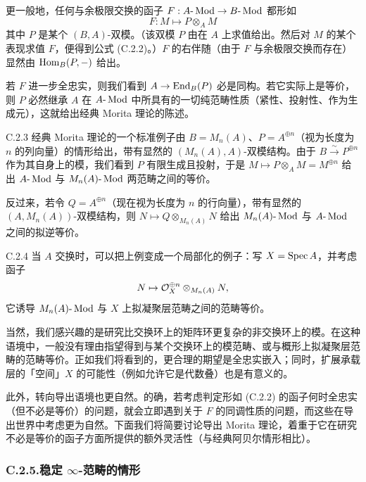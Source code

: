 
更一般地，任何与余极限交换的函子 $F:A\text{-}\operatorname{Mod}\to B\text{-}\operatorname{Mod}$ 都形如
\begin{equation}\tag{C.2.2}\label{eq:a4-19-1}
F:M\mapsto P\otimes_A M
\end{equation}
其中 $P$ 是某个 $(B,A)$-双模。（该双模 $P$ 由在 $A$ 上求值给出。然后对 $M$ 的某个表现求值 $F$，便得到公式 (C.2.2)。）$F$ 的右伴随（由于 $F$ 与余极限交换而存在）显然由 $\operatorname{Hom}_B(P,-)$ 给出。

若 $F$ 进一步全忠实，则我们看到 $A\to\operatorname{End}_B(P)$ 必是同构。若它实际上是等价，则 $P$ 必然继承 $A$ 在 $A\text{-}\operatorname{Mod}$ 中所具有的一切纯范畴性质（紧性、投射性、作为生成元），这就给出经典 Morita 理论的陈述。

\begin{exam}{C.2.3}\label{thm:a4-19-2}
经典 Morita 理论的一个标准例子由 $B=M_n(A)$、$P=A^{\oplus n}$（视为长度为 $n$ 的列向量）的情形给出，带有显然的 $(M_n(A),A)$-双模结构。由于 $B\xrightarrow{\sim}P^{\oplus n}$ 作为其自身上的模，我们看到 $P$ 有限生成且投射，于是 $M\mapsto P\otimes_A M=M^{\oplus n}$ 给出 $A\text{-}\operatorname{Mod}$ 与 $M_n(A)\text{-}\operatorname{Mod}$ 两范畴之间的等价。
\end{exam}

反过来，若令 $Q=A^{\oplus n}$（现在视为长度为 $n$ 的行向量），带有显然的 $(A,M_n(A))$-双模结构，则 $N\mapsto Q\otimes_{M_n(A)}N$ 给出 $M_n(A)\text{-}\operatorname{Mod}$ 与 $A\text{-}\operatorname{Mod}$ 之间的拟逆等价。

\begin{exam}{C.2.4}\label{thm:a4-19-3}
当 $A$ 交换时，可以把上例变成一个局部化的例子：写 $X=\operatorname{Spec} A$，并考虑函子
\[
N\mapsto\mathcal{O}_X^{\oplus n}\otimes_{M_n(A)}N,
\]
它诱导 $M_n(A)\text{-}\operatorname{Mod}$ 与 $X$ 上拟凝聚层范畴之间的范畴等价。
\end{exam}

当然，我们感兴趣的是研究比交换环上的矩阵环更复杂的非交换环上的模。在这种语境中，一般没有理由指望得到与某个交换环上的模范畴、或与概形上拟凝聚层范畴的范畴等价。正如我们将看到的，更合理的期望是全忠实嵌入；同时，扩展承载层的「空间」$X$ 的可能性（例如允许它是代数叠）也是有意义的。

此外，转向导出语境也更自然。的确，若考虑判定形如 (C.2.2) 的函子何时全忠实（但不必是等价）的问题，就会立即遇到关于 $F$ 的同调性质的问题，而这些在导出世界中考虑更为自然。下面我们将简要讨论导出 Morita 理论，着重于它在研究不必是等价的函子方面所提供的额外灵活性（与经典阿贝尔情形相比）。

\subsubsection*{C.2.5.\quad 稳定 $\infty$-范畴的情形}

